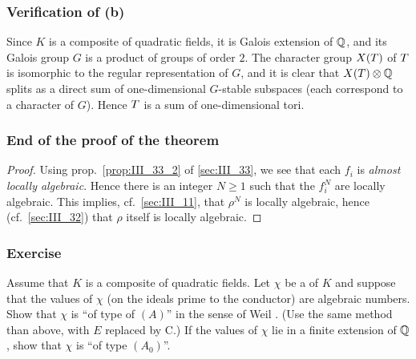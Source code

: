 \subsubsection*{Verification of (b)}

Since $K$ is a composite of quadratic fields, it is Galois extension of $\mathbb{Q}$,
and its Galois group $G$ is a product of groups of order $2$. The character
group $X(T)$ of $T$ is isomorphic to the 
\dpage 
regular representation of $G$, and it is clear that $X(T) \otimes \mathbb{Q}$ splits
as a direct sum of one-dimensional $G$-stable subspaces (each correspond to a
character of $G$). Hence $T$ is a sum of one-dimensional tori.

\subsubsection*{End of the proof of the theorem}

\begin{proof}
Using prop.~\ref{prop:III_33_2} of \ref{sec:III_33}, we see that each $f_i$ is \emph{almost
locally algebraic}. Hence there is an integer $N \geq 1$ such that the
$f_i^{N}$ are locally algebraic. This implies, cf.\ \ref{sec:III_11}, that
$\rho^N$ is locally algebraic, hence (cf.\ \ref{sec:III_32}) that $\rho$ itself
is locally algebraic. 
\end{proof}

\subsubsection*{Exercise}

Assume that $K$ is a composite of quadratic fields. Let $\chi$ be a
 of $K$ and suppose that the values of $\chi$ (on the
ideals prime to the conductor) are algebraic numbers. Show that $\chi$ is ``of
type of $(A)$'' in the sense of Weil \cite{41}. (Use the same method than above,
with $E$ replaced by C.) If the values of $\chi$ lie in a finite extension of
$\mathbb{Q}$, show that $\chi$ is ``of type $(A_0)$''.

